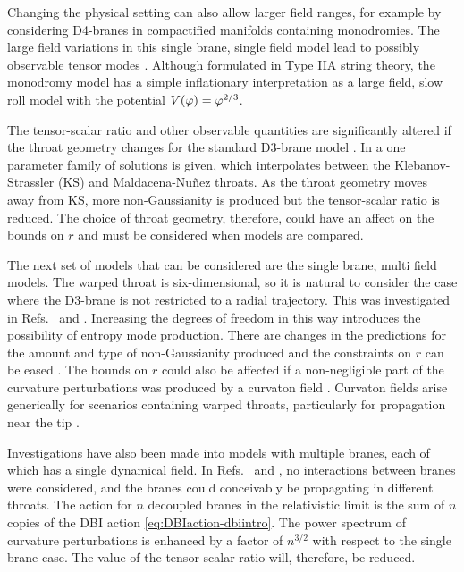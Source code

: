 Changing the physical setting can also allow larger field ranges, for example by
considering D4-branes in compactified manifolds containing monodromies. 
The large field
variations in this single brane, single field model lead to possibly observable
tensor modes
\cite{Silverstein:2008sg}. Although formulated in Type IIA string theory, the
monodromy model has a simple inflationary interpretation as a large field, slow roll
model with the potential $V(\varphi)=\varphi^{2/3}$. 

The tensor-scalar ratio and other observable quantities are
significantly altered if the throat geometry changes for the
standard D3-brane model \cite{Gmeiner:2007uw}. In
 a one parameter family of solutions is given, which interpolates
between the
Klebanov-Strassler (KS) \cite{ks} and Maldacena-Nu\~{n}ez
\cite{Maldacena:2000yy} throats. As the throat geometry moves away from KS, more
non-Gaussianity is produced but the tensor-scalar ratio is reduced.
The choice of throat geometry, therefore, could have an affect on the bounds on $r$
and must be considered when models are compared.



The next set of models that can be considered are the single brane, multi field
models. 
% 
The warped throat is six-dimensional, so it is natural to consider the case where
the D3-brane is not restricted to a radial trajectory. This was investigated in
Refs.~\cite{spinflation} and \cite{Huang:2007hh}. Increasing the degrees of
freedom in this way introduces the possibility of entropy mode production. There are
changes in the predictions for the amount and type of non-Gaussianity produced
and the constraints on $r$ can be eased \cite{Arroja:2008yy, Langlois:2009ej,
Langlois:2008qf, Langlois:2008wt, Mizuno:2009mv, Mizuno:2009cv, RenauxPetel:2009sj}.
%
The bounds on $r$ could also be affected if a non-negligible part of the
curvature perturbations was produced by a curvaton field \cite{Lyth:2001nq}.
Curvaton fields arise generically for scenarios containing warped throats,
particularly for propagation near the tip \cite{Li:2008fm, Kobayashi:2009cm}. 
% 
% 

Investigations have also been made into models with multiple branes, each of which
has a single dynamical field. In Refs.~\cite{Cai:2008if} and \cite{Cai:2009hw}, no
interactions between branes were considered, and the branes could conceivably be
propagating in different throats. The action for $n$ decoupled branes in the
relativistic limit is the sum of $n$ copies of the DBI action
\eqref{eq:DBIaction-dbiintro}. The power spectrum of curvature perturbations is
enhanced by a factor of $n^{3/2}$ with respect to the single brane case. The value
of the tensor-scalar ratio will, therefore, be reduced. 


